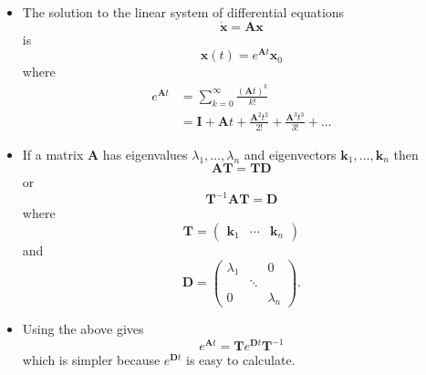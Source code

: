 \documentclass{article}
\renewcommand{\vec}[1]{\boldsymbol{\mathbf{#1}}}
\newcommand{\dvec}[1]{\dot{\vec{#1}}}
\begin{document}
\begin{itemize}
  \item The solution to the linear system of differential equations \[\dvec{x} = \vec{A} \vec{x}\] is \[\vec{x}(t) = e^{\vec{A} t} \vec{x}_0\] where \begin{align*}
          e^{\vec{A} t} & = \sum_{k = 0}^\infty \frac{(\vec{A} t)^k}{k!}                                       \\
                        & = \vec{I} + \vec{A} t + \frac{\vec{A}^2 t^2}{2!} + \frac{\vec{A}^3 t^3}{3!} + \ldots
        \end{align*}

  \item If a matrix $\vec{A}$ has eigenvalues $\lambda_1, \ldots, \lambda_n$ and eigenvectors $\vec{k}_1, \ldots, \vec{k}_n$ then \[\vec{A} \vec{T} = \vec{T} \vec{D}\] or \[\vec{T}^{-1} \vec{A} \vec{T} = \vec{D}\] where \[\vec{T} = \begin{pmatrix}
            \vec{k}_1 & \cdots & \vec{k}_n
          \end{pmatrix}\] and \[\vec{D} = \begin{pmatrix}
            \lambda_1 &        & 0         \\
                      & \ddots &           \\
            0         &        & \lambda_n
          \end{pmatrix}.\]

  \item Using the above gives \[e^{\vec{A} t} = \vec{T} e^{\vec{D} t} \vec{T}^{-1}\] which is simpler because $e^{\vec{D} t}$ is easy to calculate.


\end{itemize}
\end{document}
